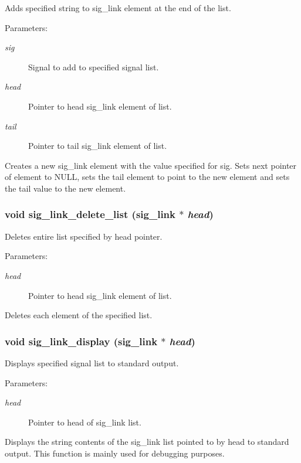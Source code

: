 Adds specified string to sig\_\-link element at the end of the list.

\begin{Desc}
\item[Parameters: ]\par
\begin{description}
\item[{\em 
sig}]Signal to add to specified signal list. \item[{\em 
head}]Pointer to head sig\_\-link element of list. \item[{\em 
tail}]Pointer to tail sig\_\-link element of list.\end{description}
\end{Desc}
Creates a new sig\_\-link element with the value specified for sig. Sets next pointer of element to NULL, sets the tail element to point to the new element and sets the tail value to the new element. 
\subsubsection{\setlength{\rightskip}{0pt plus 5cm}void sig\_\-link\_\-delete\_\-list ({\bf sig\_\-link} $\ast$ {\em head})}\label{link_8h_a14}


Deletes entire list specified by head pointer.

\begin{Desc}
\item[Parameters: ]\par
\begin{description}
\item[{\em 
head}]Pointer to head sig\_\-link element of list.\end{description}
\end{Desc}
Deletes each element of the specified list. 
\subsubsection{\setlength{\rightskip}{0pt plus 5cm}void sig\_\-link\_\-display ({\bf sig\_\-link} $\ast$ {\em head})}\label{link_8h_a6}


Displays specified signal list to standard output.

\begin{Desc}
\item[Parameters: ]\par
\begin{description}
\item[{\em 
head}]Pointer to head of sig\_\-link list.\end{description}
\end{Desc}
Displays the string contents of the sig\_\-link list pointed to by head to standard output. This function is mainly used for debugging purposes. 
